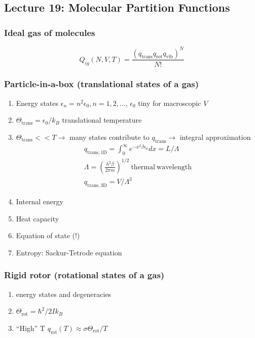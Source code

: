 \documentclass[11pt]{article}
\begin{document}
\subsection{Lecture 19: Molecular Partition Functions}
\label{sec:org38ddbda}
\subsubsection{Ideal gas of molecules}
\label{sec:org32aec4a}
\begin{displaymath}
  Q_{ig}(N,V,T) = \frac{(q_\mathrm{trans}q_\mathrm{rot}q_\mathrm{vib})^N}{N!}
\end{displaymath}

\subsubsection{Particle-in-a-box (translational states of a gas)}
\label{sec:org9a86248}
\begin{enumerate}
\item Energy states \(\epsilon_n=n^2\epsilon_0, n=1,2, \ldots\), \(\epsilon_0\) tiny for macroscopic \(V\)
\item \(\Theta_\mathrm{trans} = \epsilon_0/k_B\) translational temperature
\item \(\Theta_\mathrm{trans} << T \rightarrow\) many states contribute to \(q_\mathrm{trans}\rightarrow\) integral approximation
\begin{eqnarray*}
  q_\mathrm{trans,1D} = \int_0^\infty e^{-x^2\beta\epsilon_0}dx =
  L/\Lambda \\
  \Lambda = \left ( \frac{h^2\beta}{2\pi m} \right )^{1/2}\
  \mathrm{thermal\ wavelength} \\
  q_\mathrm{trans,3D} = V/\Lambda^3
\end{eqnarray*}
\item Internal energy
\item Heat capacity
\item Equation of state (!)
\item Entropy: Sackur-Tetrode equation
\end{enumerate}

\subsubsection{Rigid rotor (rotational states of a gas)}
\label{sec:org266c273}
\begin{enumerate}
\item energy states and degeneracies
\item \(\Theta_\mathrm{rot} = \hbar^2/2 I k_B\)
\item ``High'' T \(q_\mathrm{rot}(T) \approx \sigma \Theta_\mathrm{rot}/T\)
\end{enumerate}
\end{document}
